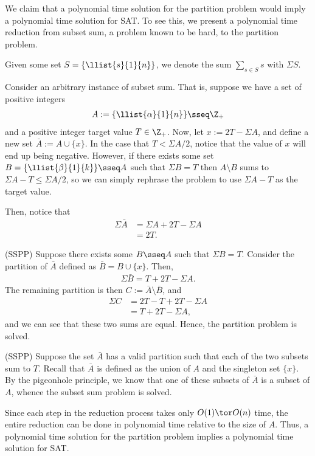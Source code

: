 \documentclass{article}
\begin{document}
\begin{solution}
We claim that a polynomial time solution for the partition problem would imply a polynomial time solution for SAT. To see this, we present a polynomial time reduction from subset sum, a problem known to be hard, to the partition problem.

\begin{note}[Notation]
Given some set $ S = \{\llist{s}{1}{n}\}$, we denote the sum $ \sum\limits_{s\in S}s $ with  $  \Sigma S $.
\end{note}

Consider an arbitrary instance of subset sum.
That is, suppose we have a set of positive integers \begin{align*}
  A := \{\llist{\alpha}{1}{n}\} \sseq \Z_+
\end{align*}
and a positive integer target value $ T\in \Z_+ $.
Now, let $ x := 2T-\Sigma A $, and define a new set $ \bar A := A\cup \{x\}$.
In the case that $ T < \Sigma A/{2} $, notice that the value of $ x $ will end up being negative.
However, if there exists some set $ B = \{\llist{\beta}{1}{k}\}\sseq A $ such that $ \Sigma B = T $ then $ A\setminus B $ sums to $ \Sigma A - T \leq \Sigma A/{2} $, so we can simply rephrase the problem to use $ \Sigma A - T$ as the target value.

Then, notice that \begin{align*}
  \Sigma \bar A &= \Sigma A + 2T-\Sigma A \\
  &= 2T.
\end{align*}
\begin{subproof}[Correctness.] (SS\imp PP)
  Suppose there exists some $ B\sseq A $ such that $ \Sigma B = T $.
  Consider the partition of $ \bar A $ defined as $ \bar B = B\cup \{x\} $.
  Then, \begin{align*}
    \Sigma \bar B= T + 2T-\Sigma A.
  \end{align*}
  The remaining partition is then $ C := \bar A\setminus \bar B $, and \begin{align*}
  \Sigma C &= 2T- T + 2T-\Sigma A \\
  &= T + 2T-\Sigma A,
  \end{align*}
  and we can see that these two sums are equal.
  Hence, the partition problem is solved.

  (SS\pmi PP)
  Suppose the set $ \bar A $ has a valid partition such that each of the two subsets sum to $ T $.
  Recall that $ \bar A $ is defined as the union of $ A $ and the singleton set $ \{x\} $.
  By the pigeonhole principle, we know that one of these subsets of $ \bar A $ is a subset of $ A $, whence the subset sum problem is solved.
\end{subproof}
Since each step in the reduction process takes only $ O(1)\tor O(n) $ time, the entire reduction can be done in polynomial time relative to the size of $ A $.
Thus, a polynomial time solution for the partition problem implies a polynomial time solution for SAT.
\end{solution}
\pagebreak
\end{document}
